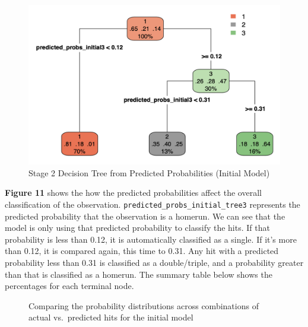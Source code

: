 \documentclass[
  letterpaper,
  DIV=11,
  numbers=noendperiod]{scrartcl}
\begin{document}
\begin{figure}[H]

{\centering \includegraphics{./images/figures/fig11.png}

}

\caption{Stage 2 Decision Tree from Predicted Probabilities (Initial
Model)}

\end{figure}%

\textbf{Figure 11} shows the how the predicted probabilities affect the
overall classification of the observation.
\texttt{predicted\_probs\_initial\_tree3} represents the predicted
probability that the observation is a homerun. We can see that the model
is only using that predicted probability to classify the hits. If that
probability is less than 0.12, it is automatically classified as a
single. If it's more than 0.12, it is compared again, this time to 0.31.
Any hit with a predicted probability less than 0.31 is classified as a
double/triple, and a probability greater than that is classified as a
homerun. The summary table below shows the percentages for each terminal
node.

\begin{figure}[H]


\caption{\label{fig-prob-den-initial}Comparing the probability
distributions across combinations of actual vs.~predicted hits for the
initial model}

\end{figure}%
\end{document}
